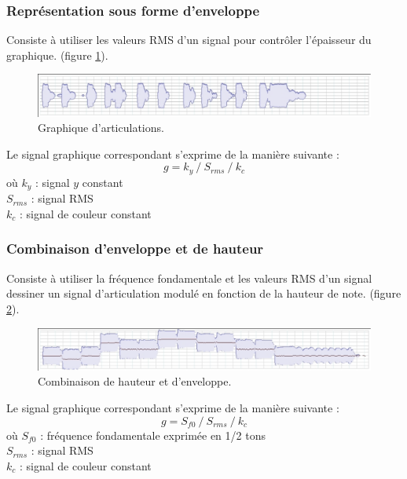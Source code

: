\documentclass{article}
\newcommand{\rshift}			{\hspace*{4mm}}
\begin{document}
\subsubsection{Représentation sous forme d'enveloppe}
Consiste à utiliser les valeurs RMS d'un signal pour contrôler l'épaisseur du graphique. 
(figure \ref{fig:articulation}).
\begin{figure}[htbp]
\centerline{
	\includegraphics[width=0.99\columnwidth]{imgs/curves/articulation}}
\caption{Graphique d'articulations.}
\label{fig:articulation}
\end{figure}

Le signal graphique correspondant s'exprime de la manière suivante :
\[ g = k_y\ /\ S_{rms}\ /\ k_c \]
où $k_y$ : signal $y$ constant \\
\rshift	 $S_{rms}$ : signal RMS \\
\rshift	 $k_c$ : signal de couleur constant 
 
\subsubsection{Combinaison d'enveloppe et de hauteur}
\label{pitchart}
Consiste à utiliser la fréquence fondamentale et les valeurs RMS d'un signal dessiner un signal d'articulation modulé en fonction de la hauteur de note. 
(figure \ref{fig:pitchedarticulation}).
\begin{figure}[htbp]
\centerline{
	\includegraphics[width=0.99\columnwidth]{imgs/curves/pitchedarticulation}}
\caption{Combinaison de hauteur et d'enveloppe.}
\label{fig:pitchedarticulation}
\end{figure}

Le signal graphique correspondant s'exprime de la manière suivante :
\[ g = S_{f0}\ /\ S_{rms}\ /\ k_c \]
où $S_{f0}$ : fréquence fondamentale  exprimée en 1/2 tons \\
\rshift	 $S_{rms}$ : signal RMS \\
\rshift $k_c$ : signal de couleur constant 
 
\end{document}

